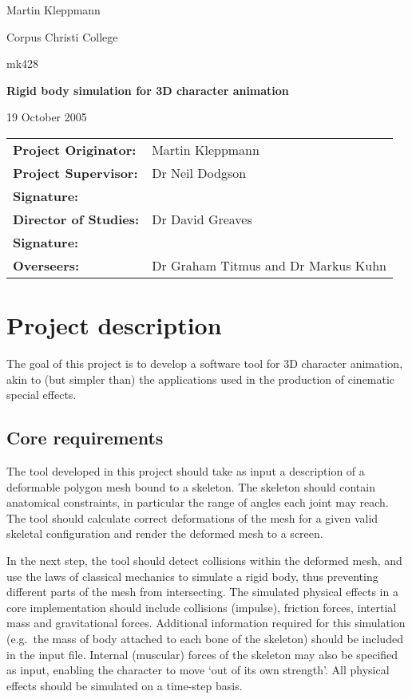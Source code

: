 \documentclass{article}
\begin{document}
{\hfill Martin Kleppmann}

{\hfill Corpus Christi College}

{\hfill mk428}

\vspace{3cm}
\centerline{\Large\bf Rigid body simulation for 3D character animation}
\vspace{1cm}
\centerline{19 October 2005}

\vspace{3cm}
\begin{tabular}{ll}
{\bf Project Originator:} & Martin Kleppmann \vspace{1.5cm}\\
{\bf Project Supervisor:} & Dr Neil Dodgson \vspace{0.5cm}\\
{\bf Signature:} & \vspace{1.5cm}\\
{\bf Director of Studies:} & Dr David Greaves \vspace{0.5cm}\\
{\bf Signature:} & \vspace{1.5cm}\\
{\bf Overseers:} & Dr Graham Titmus and Dr Markus Kuhn\\
\end{tabular}
\newpage

\section*{Project description}

The goal of this project is to develop a software tool for 3D character
animation, akin to (but simpler than) the applications used in the
production of cinematic special effects.

\subsection*{Core requirements}

The tool developed in this project should take as input a description
of a deformable polygon mesh bound to a skeleton. The skeleton should
contain anatomical constraints, in particular the range of angles each
joint may reach. The tool should calculate correct deformations of the
mesh for a given valid skeletal configuration and render the deformed
mesh to a screen.

In the next step, the tool should detect collisions within the
deformed mesh, and use the laws of classical mechanics to simulate a
rigid body, thus preventing different parts of the mesh from
intersecting. The simulated physical effects in a core implementation
should include collisions (impulse), friction forces, intertial mass
and gravitational forces. Additional information required for this
simulation (e.g.\ the mass of body attached to each bone of the
skeleton) should be included in the input file. Internal (muscular)
forces of the skeleton may also be specified as input, enabling the
character to move `out of its own strength'. All physical effects
should be simulated on a time-step basis.
\end{document}
